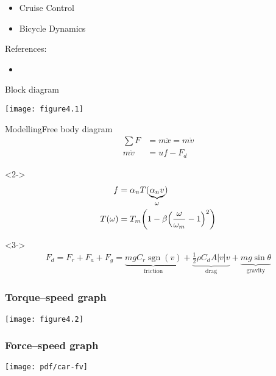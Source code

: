 \documentclass{beamer-control}
\begin{document}

\begin{SUMMARY}
\begin{itemize}
\item Cruise Control
\item Bicycle Dynamics
\end{itemize}
\vfill References:
\begin{itemize}
\item {}
\end{itemize}
\end{SUMMARY}




\begin{frame}{Block diagram}
\vfill

\texttt{[image: figure4.1]}

\end{frame}

\begin{frame}{Modelling}{Free body diagram}
\begin{align}
\sum F &= m\ddot x = m\dot v \\
m\dot v &= uf - F_d
\end{align}
\begin{uncoverenv}<2->
\begin{align}
f &= \alpha_n T(\underbrace{\alpha_n v}_{\omega}) \\
T(\omega) &= T_m \biggl( 1 - \beta\Bigl(\frac{\omega}{\omega_m}-1\Bigr)^2 \biggr)
\end{align}
\end{uncoverenv}
\begin{uncoverenv}<3->
\begin{align}
F_d = F_r + F_a + F_g = \underbrace{mg C_r \operatorname{sgn}(v)}_{\text{friction}} + \underbrace{\tfrac12 \rho C_dA|v|v}_{\text{drag}} + \underbrace{mg\sin\theta}_{\text{gravity}}
\end{align}
\end{uncoverenv}
\end{frame}

\begin{frame}
\frametitle{Torque--speed graph}
\texttt{[image: figure4.2]}

\end{frame}

\begin{frame}
\frametitle{Force--speed graph}
\centering
\texttt{[image: pdf/car-fv]}

\end{frame}
\end{document}
